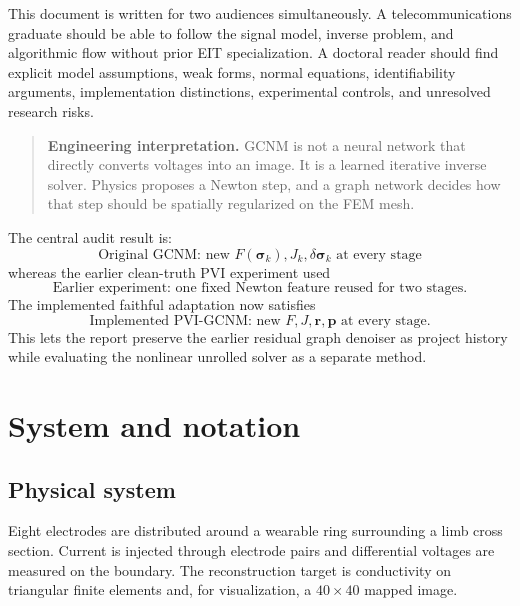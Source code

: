 \documentclass[11pt]{article}
\newcommand{\sig}{\bm{\sigma}}
\newcommand{\plain}[1]{%
  \begin{quote}\color{blue!45!black}\textbf{Engineering interpretation.} #1\end{quote}}
\begin{document}
This document is written for two audiences simultaneously.  A telecommunications
graduate should be able to follow the signal model, inverse problem, and algorithmic
flow without prior EIT specialization.  A doctoral reader should find explicit
model assumptions, weak forms, normal equations, identifiability arguments,
implementation distinctions, experimental controls, and unresolved research risks.

\plain{GCNM is not a neural network that directly converts voltages into an image.
It is a learned iterative inverse solver.  Physics proposes a Newton step, and a
graph network decides how that step should be spatially regularized on the FEM mesh.}

The central audit result is:
\begin{equation}
  \boxed{\text{Original GCNM: new }F(\sig_k),J_k,\delta\sig_k\text{ at every stage}}
\end{equation}
whereas the earlier clean-truth PVI experiment used
\begin{equation}
  \boxed{\text{Earlier experiment: one fixed Newton feature reused for two stages}.}
\end{equation}
The implemented faithful adaptation now satisfies
\begin{equation}
  \boxed{\text{Implemented PVI-GCNM: new }F,J,\bm r,\bm p\text{ at every stage}.}
\end{equation}
This lets the report preserve the earlier residual graph denoiser as project history
while evaluating the nonlinear unrolled solver as a separate method.

\section{System and notation}

\subsection{Physical system}

Eight electrodes are distributed around a wearable ring surrounding a limb cross
section.  Current is injected through electrode pairs and differential voltages are
measured on the boundary.  The reconstruction target is conductivity on triangular
finite elements and, for visualization, a $40\times40$ mapped image.
\end{document}
